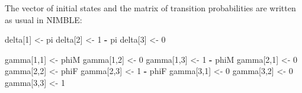 \documentclass[
  12pt,
]{krantz}
\newenvironment{Shaded}{\begin{snugshade}}{\end{snugshade}}
\newcommand{\DecValTok}[1]{\textcolor[rgb]{0.00,0.00,0.81}{#1}}
\newcommand{\NormalTok}[1]{#1}
\newcommand{\OtherTok}[1]{\textcolor[rgb]{0.56,0.35,0.01}{#1}}
\newcommand{\SpecialCharTok}[1]{\textcolor[rgb]{0.81,0.36,0.00}{\textbf{#1}}}
\begin{document}
The vector of initial states and the matrix of transition probabilities are written as usual in NIMBLE:

\begin{Shaded}
\begin{Highlighting}[]
\NormalTok{  delta[}\DecValTok{1}\NormalTok{] }\OtherTok{\textless{}{-}}\NormalTok{ pi}
\NormalTok{  delta[}\DecValTok{2}\NormalTok{] }\OtherTok{\textless{}{-}} \DecValTok{1} \SpecialCharTok{{-}}\NormalTok{ pi}
\NormalTok{  delta[}\DecValTok{3}\NormalTok{] }\OtherTok{\textless{}{-}} \DecValTok{0}
  
\NormalTok{  gamma[}\DecValTok{1}\NormalTok{,}\DecValTok{1}\NormalTok{] }\OtherTok{\textless{}{-}}\NormalTok{ phiM            }
\NormalTok{  gamma[}\DecValTok{1}\NormalTok{,}\DecValTok{2}\NormalTok{] }\OtherTok{\textless{}{-}} \DecValTok{0}               
\NormalTok{  gamma[}\DecValTok{1}\NormalTok{,}\DecValTok{3}\NormalTok{] }\OtherTok{\textless{}{-}} \DecValTok{1} \SpecialCharTok{{-}}\NormalTok{ phiM        }
\NormalTok{  gamma[}\DecValTok{2}\NormalTok{,}\DecValTok{1}\NormalTok{] }\OtherTok{\textless{}{-}} \DecValTok{0}               
\NormalTok{  gamma[}\DecValTok{2}\NormalTok{,}\DecValTok{2}\NormalTok{] }\OtherTok{\textless{}{-}}\NormalTok{ phiF            }
\NormalTok{  gamma[}\DecValTok{2}\NormalTok{,}\DecValTok{3}\NormalTok{] }\OtherTok{\textless{}{-}} \DecValTok{1} \SpecialCharTok{{-}}\NormalTok{ phiF        }
\NormalTok{  gamma[}\DecValTok{3}\NormalTok{,}\DecValTok{1}\NormalTok{] }\OtherTok{\textless{}{-}} \DecValTok{0}               
\NormalTok{  gamma[}\DecValTok{3}\NormalTok{,}\DecValTok{2}\NormalTok{] }\OtherTok{\textless{}{-}} \DecValTok{0}               
\NormalTok{  gamma[}\DecValTok{3}\NormalTok{,}\DecValTok{3}\NormalTok{] }\OtherTok{\textless{}{-}} \DecValTok{1}               
\end{Highlighting}
\end{Shaded}
\end{document}
